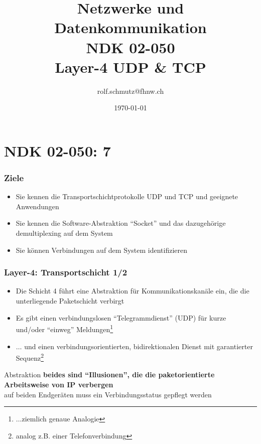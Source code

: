 \documentclass[ignorenonframetext]{beamer}
\date{\today}
\author{rolf.schmutz@fhnw.ch}
\institute{FHNW}
\title {Netzwerke und Datenkommunikation\\NDK 02-050\\Layer-4 UDP \& TCP}
\begin{document}

\section{NDK 02-050: 7}



\begin{frame}
\titlepage
\end{frame}




\begin{frame}
\frametitle{Ziele}
\begin{itemize}
	\item{Sie kennen die Transportschichtprotokolle UDP und TCP und geeignete Anwendungen}
	\item{Sie kennen die Software-Abstraktion ``Socket'' und das dazugeh\"orige demultiplexing auf dem System}
	\item{Sie k\"onnen Verbindungen auf dem System identifizieren}
\end{itemize}
\end{frame}



\begin{frame}
\frametitle{Layer-4: Transportschicht 1/2}
\begin{itemize}
	\item{Die Schicht 4 f\"uhrt eine Abstraktion f\"ur Kommunikationskan\"ale ein, die die unterliegende Paketschicht verbirgt}
	\item[1]{Es gibt einen verbindungslosen ``Telegrammdienst'' (UDP) f\"ur kurze und/oder ``einweg'' Meldungen\footnote{$\ldots$ziemlich genaue Analogie}}
	\item[2]{$\ldots$ und einen verbindungsorientierten, bidirektionalen Dienst mit garantierter Sequenz\footnote{analog z.B. einer Telefonverbindung}}
\end{itemize}
	\begin{block}{Abstraktion}
\textbf{beides sind ``Illusionen'', die die paketorientierte Arbeitsweise von IP verbergen}\\
auf beiden Endger\"aten muss ein Verbindungsstatus gepflegt werden
\end{block}
\end{frame}
\end{document}
